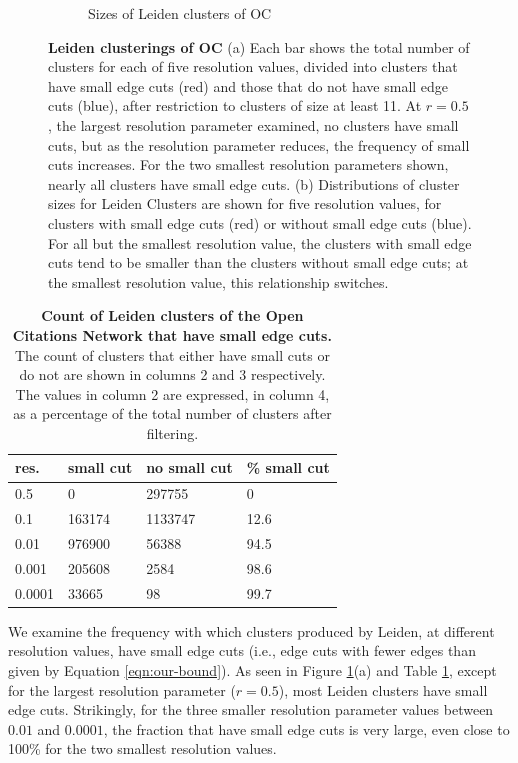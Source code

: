 \documentclass[11pt]{article}   	%
\begin{document}
\begin{figure}[H]
\begin{subfigure}[t]{0.45\textwidth}
\begin{center}
\caption{Sizes of Leiden clusters of OC}
\end{center}
\end{subfigure}
\caption{\textbf {Leiden clusterings of OC} (a)
Each bar shows the total number of clusters for each of five resolution values, divided into clusters that have small edge cuts (red)  and those that do not have small edge cuts (blue), after restriction  to clusters of size at least 11. At $r=0.5$, the largest resolution parameter examined, no clusters have small cuts, but  as the resolution parameter reduces, the frequency of  small cuts increases. For the two smallest resolution parameters shown, nearly all clusters have small edge cuts.
(b)  Distributions of cluster sizes  for Leiden Clusters are shown for five resolution values, for clusters with small edge cuts (red) or without small edge cuts (blue). For all but the smallest resolution value, the clusters with small edge cuts tend to be smaller than the clusters without small edge cuts; at the smallest resolution value, this relationship switches.}
\label{fig:ocistouched-leiden}
\end{figure}


\begin{table}[ht]
\centering
\begin{tabular}{llll}
\hline
res. & small cut & no small cut & \% small cut   \\
\hline
0.5 & 0 & 297755 & 0 \\
0.1 & 163174 & 1133747 & 12.6  \\
0.01 & 976900 & 56388 & 94.5\\
0.001 & 205608 & 2584 & 98.6 \\
0.0001 & 33665 &  98 & 99.7 \\
\hline
\end{tabular}
\caption{\textbf{Count of Leiden clusters of the Open Citations Network that have small edge cuts.} The count of clusters that either have small cuts or do not are shown in columns 2 and 3 respectively. The values in column 2
are expressed, in column 4, as a percentage of the total number of clusters after filtering.}

\label{tab:ocistouched-part1}
\end{table}


We examine the frequency with which clusters produced by Leiden, at different resolution values, have small edge cuts  (i.e., edge cuts with fewer edges than given by Equation \ref{eqn:our-bound}).
As seen in Figure  \ref{fig:ocistouched-leiden}(a) and Table \ref{tab:ocistouched-part1}, except for the largest resolution parameter ($r=0.5$), most Leiden clusters have small edge cuts.
Strikingly, for the three smaller resolution parameter values between $0.01$ and $0.0001$, the fraction that have small edge cuts   is very large, even close to 100\% for the two smallest resolution values.
\end{document}
